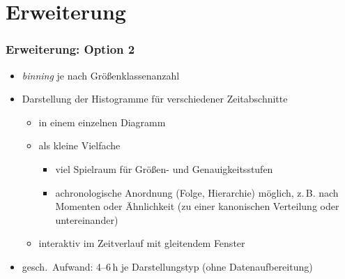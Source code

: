 \documentclass{beamer}
\begin{document}
    \section{Erweiterung}
    \begin{frame}
			\frametitle{Erweiterung: Option 2}
			\begin{itemize}
				\setlength\itemsep{1em}
				\item \emph{binning} je nach Größenklassenanzahl
				\item Darstellung der Histogramme für verschiedener Zeitabschnitte
					\begin{itemize}
						\item in einem einzelnen Diagramm
						\item als kleine Vielfache
							\begin{itemize}
								\item viel Spielraum für Größen- und Genauigkeitsstufen
								\item achronologische Anordnung (Folge, Hierarchie) möglich, z.\,B. nach Momenten oder Ähnlichkeit (zu einer kanonischen Verteilung oder untereinander)
							\end{itemize}
						\item interaktiv im Zeitverlauf mit gleitendem Fenster
					\end{itemize}
				\item gesch.\ Aufwand: 4--6\,h je Darstellungstyp (ohne Datenaufbereitung)
			\end{itemize}
    \end{frame}
\end{document}
